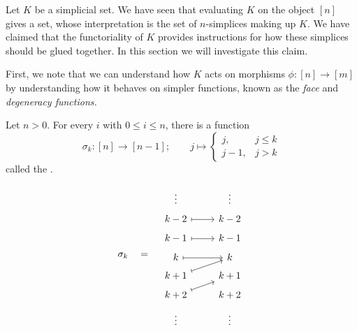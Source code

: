 \documentclass[main.tex]{subfiles}
\begin{document}
Let $K$ be a simplicial set. We have seen that evaluating $K$ on the object $[n]$ gives a set, whose interpretation is the set of $n$-simplices making up $K$. We have claimed that the functoriality of $K$ provides instructions for how these simplices should be glued together. In this section we will investigate this claim.

First, we note that we can understand how $K$ acts on morphisms $\phi\colon [n] \to [m]$ by understanding how it behaves on simpler functions, known as the \emph{face} and \emph{degeneracy functions.}

\begin{definition}
  \label{def:degeneracy_function_simplicial_category}
  Let $n > 0$. For every $i$ with $0 \leq i \leq n$, there is a function
  \begin{equation*}
    \sigma_{k}\colon [n] \to [n - 1];\qquad j \mapsto
    \begin{cases}
      j, & j \leq k \\
      j - 1, & j > k
    \end{cases}
  \end{equation*}
  called the .
\end{definition}
\begin{equation*}
  \sigma_{k} \quad = \quad
  \begin{tikzcd}[row sep=tiny]
    \vdots & \vdots
    \\
    k-2
    \arrow[r, mapsto]
    & k-2
    \\
    k-1 
    \arrow[r, mapsto]
    & k-1
    \\
    k 
    \arrow[r, mapsto]
    & k
    \\
    k+1 
    \arrow[ur, mapsto]
    & k+1
    \\
    k+2
    \arrow[ur, mapsto]
    & k+2
    \\
    \vdots & \vdots
  \end{tikzcd}
\end{equation*}
\end{document}
